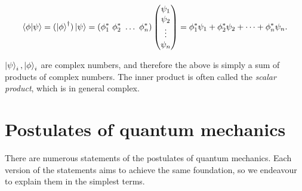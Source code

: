     \begin{equation}
    \braket{\phi | \psi} = (\ket{\phi}^{\dag})\ket{\psi}
    = (\phi_1^* \ \phi_2^* \ \hdots \ \phi_n^*) \left(\begin{matrix}\psi_1 \\ \psi_2 \\ \vdots \\ \psi_n\end{matrix}\right)
    = \phi_1^* \psi_1 + \phi_2^* \psi_2 + \dots + \phi_n^* \psi_n.
    \end{equation}

$\ket{\psi}_i, \ket{\phi}_i$ are complex numbers, and therefore the above is simply a sum of products of complex numbers. 
The inner product is often called the \emph{scalar product}, which is in general complex.

\section{Postulates of quantum mechanics}\label{sec:postulates}

There are numerous statements of the postulates of quantum mechanics. 
Each version of the statements aims to achieve the same foundation, so we endeavour to explain them in the simplest terms. 

